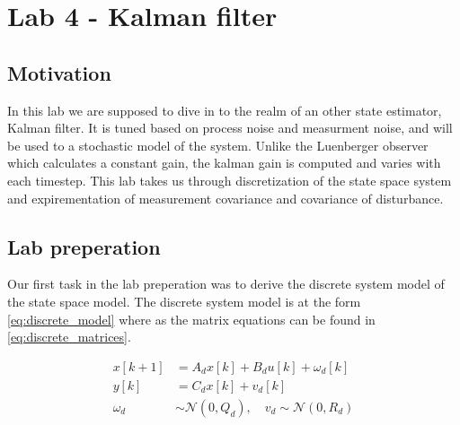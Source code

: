 \section{Lab 4 - Kalman filter}
\subsection{Motivation}
In this lab we are supposed to dive in to the realm of an other state estimator, Kalman filter. It is tuned based on process noise and measurment noise, and will be used to a stochastic model of the system.
Unlike the Luenberger observer which calculates a constant gain, the kalman gain is computed and varies with each timestep. This lab takes us through discretization 
of the state space system and expirementation of measurement covariance and covariance of disturbance. 

\subsection{Lab preperation}
Our first task in the lab preperation was to derive the discrete system model of the state space model.
The discrete system model is at the form \ref{eq:discrete_model} where as the matrix equations can be found in \ref{eq:discrete_matrices}.

\begin{subequations}\label{eq:discrete_model}
    \begin{align}
    x[k+1] &= A_d x[k] + B_d u[k] + \omega_d[k] \label{eq:discrete_x} \\
    y[k] &= C_d x[k] + v_d[k] \label{eq:discrete_y} \\
    \omega_d &\sim \mathcal{N}(0, Q_d), \quad v_d \sim \mathcal{N}(0, R_d) \label{eq:discrete_noise}
    \end{align}
\end{subequations}


